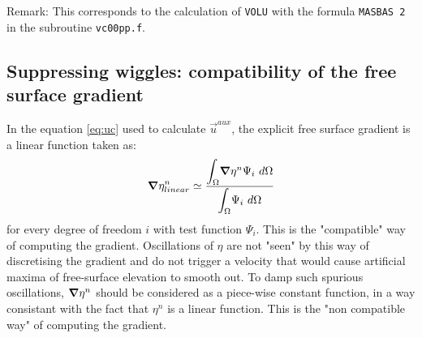 \begin{CommentBlock}{Remark:}
This corresponds to the calculation of \texttt{VOLU} with the formula
\texttt{MASBAS 2} in the subroutine \texttt{vc00pp.f}.
\end{CommentBlock}

\subsection{Suppressing wiggles: compatibility of the free surface gradient}

In the equation \eqref{eq:uc} used to calculate $\vec{u}^{aux}$,
the explicit free surface gradient is a linear function taken as:
\begin{equation}
\bm{\nabla}\eta^{n}_{linear}\simeq\dfrac{{\displaystyle\int_{\Omega}}
\bm{\nabla}\eta^{n}\Psi_{i}~d\Omega}{{\displaystyle\int_{\Omega}}
\Psi_{i}~d\Omega}
\end{equation}
for every degree of freedom $i$ with test function $\Psi_{i}$. This is the
"compatible" way of computing the gradient. Oscillations of $\eta$ are
not "seen" by this way of discretising the gradient and do not
trigger a velocity that would
cause artificial maxima of free-surface elevation to smooth out.
To damp such spurious oscillations, $\bm{\nabla}\eta^{n}$ should be considered as a
piece-wise constant function, in a way consistant with the fact
that $\eta^{n}$ is a linear function. This is the "non compatible way"
of computing the gradient.

